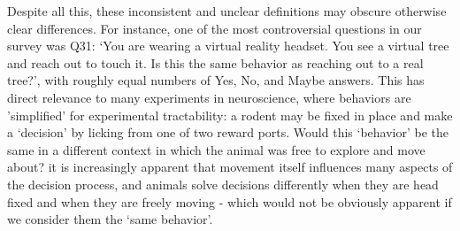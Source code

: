 \documentclass[a4paper, 11pt]{article}
\begin{document}
Despite all this, these inconsistent and unclear definitions may obscure otherwise clear differences. For instance, one of the most controversial questions in our survey was Q31: `You are wearing a virtual reality headset. You see a virtual tree and reach out to touch it. Is this the same behavior as reaching out to a real tree?', with roughly equal numbers of Yes, No, and Maybe answers. This has direct relevance to many experiments in neuroscience, where behaviors are 'simplified' for experimental tractability: a rodent may be fixed in place and make a `decision' by licking from one of two reward ports. Would this `behavior' be the same in a different context in which the animal was free to explore and move about? it is increasingly apparent that movement itself influences many aspects of the decision process, and animals solve decisions differently when they are head fixed and when they are freely moving \cite{eisenreich2019macaques} - which would not be obviously apparent if we consider them the `same behavior'.



\end{document}
